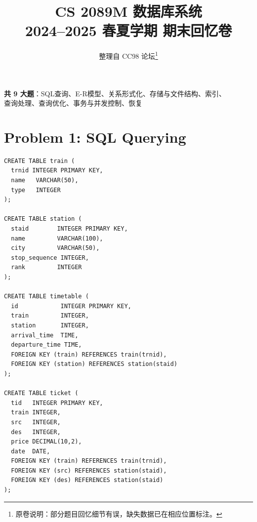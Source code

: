 \documentclass[11pt,a4paper]{article}
\title{CS 2089M 数据库系统\\2024--2025 春夏学期 期末回忆卷}
\author{整理自 CC98 论坛\thanks{原卷说明：部分题目回忆细节有误，缺失数据已在相应位置标注。}}
\date{}
\begin{document}
\maketitle

\vspace{-8pt}
\begin{center}
\textbf{共 9 大题}：SQL查询、E-R模型、关系形式化、存储与文件结构、索引、\\
查询处理、查询优化、事务与并发控制、恢复
\end{center}

\section*{Problem 1: SQL Querying}

\begin{verbatim}
CREATE TABLE train (
  trnid INTEGER PRIMARY KEY,
  name   VARCHAR(50),
  type   INTEGER
);

CREATE TABLE station (
  staid        INTEGER PRIMARY KEY,
  name         VARCHAR(100),
  city         VARCHAR(50),
  stop_sequence INTEGER,
  rank         INTEGER
);

CREATE TABLE timetable (
  id            INTEGER PRIMARY KEY,
  train         INTEGER,
  station       INTEGER,
  arrival_time  TIME,
  departure_time TIME,
  FOREIGN KEY (train) REFERENCES train(trnid),
  FOREIGN KEY (station) REFERENCES station(staid)
);

CREATE TABLE ticket (
  tid   INTEGER PRIMARY KEY,
  train INTEGER,
  src   INTEGER,
  des   INTEGER,
  price DECIMAL(10,2),
  date  DATE,
  FOREIGN KEY (train) REFERENCES train(trnid),
  FOREIGN KEY (src) REFERENCES station(staid),
  FOREIGN KEY (des) REFERENCES station(staid)
);
\end{verbatim}
\end{document}
